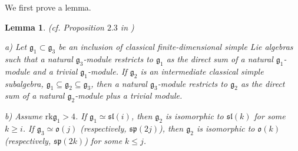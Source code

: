 \documentclass[10pt]{amsart}
\newcounter{theorem}
\newtheorem{lemma}[theo]{Lemma}
\renewcommand{\sp}{\mathfrak{sp}}
\renewcommand{\sl}{\mathfrak{sl}}
\newcommand{\oo}{\mathfrak{o}}
\renewcommand{\gg}{\mathfrak{g}}
\begin{document}
We first prove a lemma.

\begin{lemma}\label{lemma:1.4.10}(cf. Proposition $2.3$ in \cite{dip2})

a) Let $\gg_1 \subset \gg_3$ be an inclusion of classical finite-dimensional simple Lie algebras such that a natural $\gg_3$-module restricts to $\gg_1$ as 
the direct sum of a natural $\gg_1$-module and a trivial $\gg_1$-module. If $\gg_2$ is an intermediate classical simple subalgebra, 
$\gg_1\subseteq\gg_2\subseteq\gg_3$, 
then a natural $\gg_3$-module restricts to $\gg_2$ as the direct sum of a natural $\gg_2$-module plus a trivial module. 

b) Assume $\mathrm{rk} \gg_1 > 4$.
If $\gg_1\simeq \sl(i)$, then $\gg_2$ is isomorphic to $\sl(k)$ for some $k\geq i$. If $\gg_3\simeq \oo(j)$   
(respectively, $\sp(2j)$), then $\gg_2$ is isomorphic to $\oo(k)$ (respectively, $\sp(2k)$) for some $k\leq j$.
\end{lemma}
\end{document}
